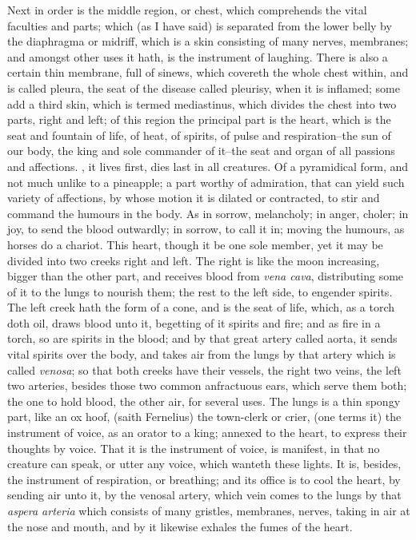 Next in order is the middle region, or chest, which comprehends the vital
faculties and parts; which (as I have said) is separated from the lower belly
by the diaphragma or midriff, which is a skin consisting of many nerves,
membranes; and amongst other uses it hath, is the instrument of laughing. There
is also a certain thin membrane, full of sinews, which covereth the whole chest
within, and is called pleura, the seat of the disease called pleurisy, when it
is inflamed; some add a third skin, which is termed mediastinus, which divides
the chest into two parts, right and left; of this region the principal part is
the heart, which is the seat and fountain of life, of heat, of spirits, of
pulse and respiration--the sun of our body, the king and sole commander of
it--the seat and organ of all passions and affections. , it lives first, dies last in all creatures. Of a pyramidical
form, and not much unlike to a pineapple; a part worthy of
admiration, that can yield such variety of affections, by
whose motion it is dilated or contracted, to stir and command the humours in
the body. As in sorrow, melancholy; in anger, choler; in joy, to send the blood
outwardly; in sorrow, to call it in; moving the humours, as horses do a
chariot. This heart, though it be one sole member, yet it may be divided into
two creeks right and left. The right is like the moon increasing, bigger than
the other part, and receives blood from \emph{vena cava}, distributing some of
it to the lungs to nourish them; the rest to the left side, to engender
spirits. The left creek hath the form of a cone, and is the seat of life,
which, as a torch doth oil, draws blood unto it, begetting of it spirits and
fire; and as fire in a torch, so are spirits in the blood; and by that great
artery called aorta, it sends vital spirits over the body, and takes air from
the lungs by that artery which is called \emph{venosa}; so that both creeks
have their vessels, the right two veins, the left two arteries, besides those
two common anfractuous ears, which serve them both; the one to hold blood, the
other air, for several uses. The lungs is a thin spongy part, like an ox hoof,
(saith Fernelius) the town-clerk or crier,
(one terms it) the instrument of voice, as an orator to a
king; annexed to the heart, to express their thoughts by voice. That it is the
instrument of voice, is manifest, in that no creature can speak, or utter any
voice, which wanteth these lights. It is, besides, the instrument of
respiration, or breathing; and its office is to cool the heart, by sending air
unto it, by the venosal artery, which vein comes to the lungs by that
\emph{aspera arteria} which consists of many gristles, membranes, nerves,
taking in air at the nose and mouth, and by it likewise exhales the fumes of
the heart.

